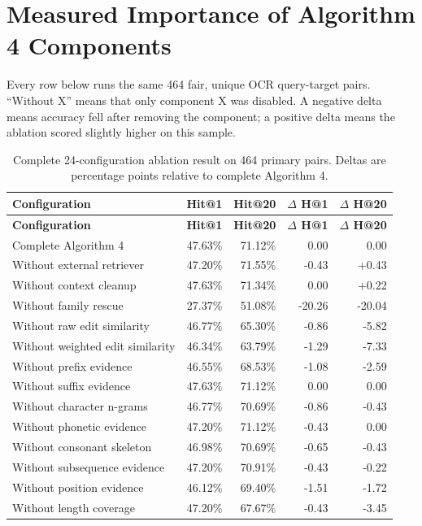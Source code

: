 \documentclass[11pt,a4paper]{article}
\begin{document}
\clearpage
\section{Measured Importance of Algorithm 4 Components}

Every row below runs the same 464 fair, unique OCR query-target pairs. ``Without
X'' means that only component X was disabled. A negative delta means accuracy
fell after removing the component; a positive delta means the ablation scored
slightly higher on this sample.

\setcounter{table}{10}
\footnotesize
\begin{longtable}{@{}lrrrr@{}}
\caption{Complete 24-configuration ablation result on 464 primary pairs. Deltas
are percentage points relative to complete Algorithm 4.}\\
\toprule
\textbf{Configuration} & \textbf{Hit@1} & \textbf{Hit@20} &
\textbf{$\Delta$ H@1} & \textbf{$\Delta$ H@20} \\
\midrule
\endfirsthead
\toprule
\textbf{Configuration} & \textbf{Hit@1} & \textbf{Hit@20} &
\textbf{$\Delta$ H@1} & \textbf{$\Delta$ H@20} \\
\midrule
\endhead
Complete Algorithm 4 & 47.63\% & 71.12\% & 0.00 & 0.00 \\
Without external retriever & 47.20\% & 71.55\% & -0.43 & +0.43 \\
Without context cleanup & 47.63\% & 71.34\% & 0.00 & +0.22 \\
Without family rescue & 27.37\% & 51.08\% & -20.26 & -20.04 \\
Without raw edit similarity & 46.77\% & 65.30\% & -0.86 & -5.82 \\
Without weighted edit similarity & 46.34\% & 63.79\% & -1.29 & -7.33 \\
Without prefix evidence & 46.55\% & 68.53\% & -1.08 & -2.59 \\
Without suffix evidence & 47.63\% & 71.12\% & 0.00 & 0.00 \\
Without character n-grams & 46.77\% & 70.69\% & -0.86 & -0.43 \\
Without phonetic evidence & 47.20\% & 71.12\% & -0.43 & 0.00 \\
Without consonant skeleton & 46.98\% & 70.69\% & -0.65 & -0.43 \\
Without subsequence evidence & 47.20\% & 70.91\% & -0.43 & -0.22 \\
Without position evidence & 46.12\% & 69.40\% & -1.51 & -1.72 \\
Without length coverage & 47.20\% & 67.67\% & -0.43 & -3.45 \\

\end{longtable}
\end{document}

